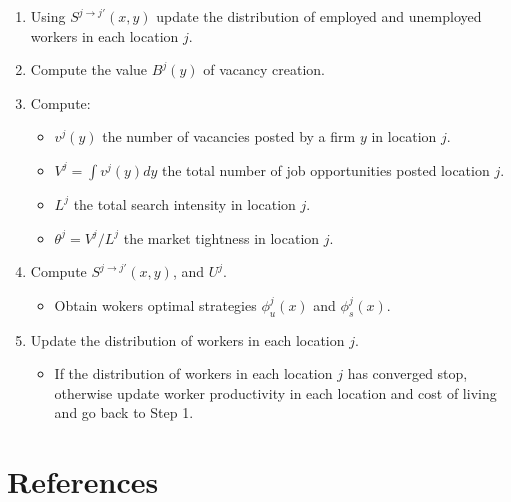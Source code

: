 \documentclass[
  letterpaper,
  DIV=11,
  numbers=noendperiod]{scrartcl}
\providecommand{\tightlist}{%
  \setlength{\itemsep}{0pt}\setlength{\parskip}{0pt}}\usepackage{longtable,booktabs,array}
\begin{document}
\begin{enumerate}
\def\labelenumi{\arabic{enumi}.}
\item
  Using \(S^{j \to j'}(x,y)\) update the distribution of employed and
  unemployed workers in each location \(j\).
\item
  Compute the value \(B^j(y)\) of vacancy creation.
\item
  Compute:

  \begin{itemize}
  \tightlist
  \item
    \(v^j(y)\) the number of vacancies posted by a firm \(y\) in
    location \(j\).
  \item
    \(V^j= \int v^j(y) dy\) the total number of job opportunities posted
    location \(j\).
  \item
    \(L^j\) the total search intensity in location \(j\).
  \item
    \(\theta^j = V^j / L^j\) the market tightness in location \(j\).
  \end{itemize}
\item
  Compute \(S^{j \to j'}(x,y)\), and \(U^{j}\).

  \begin{itemize}
  \tightlist
  \item
    Obtain wokers optimal strategies \(\phi^j_u(x)\) and
    \(\phi^j_s(x)\).
  \end{itemize}
\item
  Update the distribution of workers in each location \(j\).

  \begin{itemize}
  \tightlist
  \item
    If the distribution of workers in each location \(j\) has converged
    stop, otherwise update worker productivity in each location and cost
    of living and go back to Step 1.
  \end{itemize}
\end{enumerate}

\hypertarget{bibliography}{%
\section*{References}\label{bibliography}}
\end{document}
